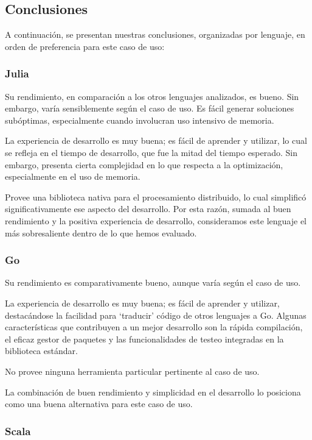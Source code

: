 \documentclass[11pt]{article}
\let\Oldsubsection\subsection
\renewcommand{\subsection}{\FloatBarrier\Oldsubsection}
\let\Oldsubsubsection\subsubsection
\renewcommand{\subsubsection}{\FloatBarrier\Oldsubsubsection}
\begin{document}
\subsection{Conclusiones}

A continuación, se presentan nuestras conclusiones, organizadas por lenguaje, en orden de preferencia para este caso de uso:

\subsubsection{Julia}

Su rendimiento, en comparación a los otros lenguajes analizados, es bueno. Sin embargo, varía sensiblemente según el caso de uso. Es fácil generar soluciones subóptimas, especialmente cuando involucran uso intensivo de memoria.

La experiencia de desarrollo es muy buena; es fácil de aprender y utilizar, lo cual se refleja en el tiempo de desarrollo, que fue la mitad del tiempo esperado. Sin embargo, presenta cierta complejidad en lo que respecta a la optimización, especialmente en el uso de memoria.

Provee una biblioteca nativa para el procesamiento distribuido, lo cual simplificó significativamente ese aspecto del desarrollo. Por esta razón, sumada al buen rendimiento y la positiva experiencia de desarrollo, consideramos este lenguaje el más sobresaliente dentro de lo que hemos evaluado.

\subsubsection{Go}

Su rendimiento es comparativamente bueno, aunque varía según el caso de uso.

La experiencia de desarrollo es muy buena; es fácil de aprender y utilizar, destacándose la facilidad para `traducir' código de otros lenguajes a Go. Algunas características que contribuyen a un mejor desarrollo son la rápida compilación, el eficaz gestor de paquetes y las funcionalidades de testeo integradas en la biblioteca estándar.

No provee ninguna herramienta particular pertinente al caso de uso.

La combinación de buen rendimiento y simplicidad en el desarrollo lo posiciona como una buena alternativa para este caso de uso.

\subsubsection{Scala}
\end{document}
